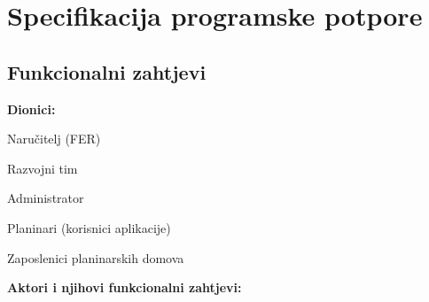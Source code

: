 \chapter{Specifikacija programske potpore}
		
	\section{Funkcionalni zahtjevi}
			
			
			\noindent \textbf{Dionici:}
			
			\begin{packed_enum}
				
				\item Naručitelj (FER)
				\item Razvojni tim
				\item Administrator				
				\item Planinari (korisnici aplikacije)
				\item Zaposlenici planinarskih domova
				
			\end{packed_enum}
			
			\noindent \textbf{Aktori i njihovi funkcionalni zahtjevi:}
			
